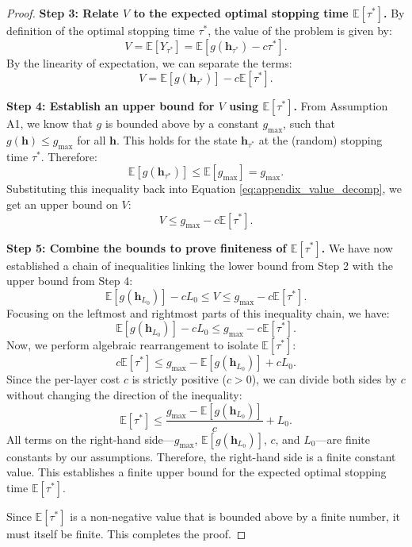 \documentclass[12pt]{imsart}
\newcommand{\E}{\mathbb{E}}
\newcommand{\h}{\mathbf{h}}
\theoremstyle{plain}
\theoremstyle{definition}
\begin{document}
\begin{proof}
\textbf{Step 3: Relate $V$ to the expected optimal stopping time $\E[\tau^*]$.}
By definition of the optimal stopping time $\tau^*$, the value of the problem is given by:
\[ V = \E[Y_{\tau^*}] = \E[g(\h_{\tau^*}) - c\tau^*]. \]
By the linearity of expectation, we can separate the terms:
\begin{equation} \label{eq:appendix_value_decomp}
V = \E[g(\h_{\tau^*})] - c\E[\tau^*].
\end{equation}

\textbf{Step 4: Establish an upper bound for $V$ using $\E[\tau^*]$.}
From Assumption A1, we know that $g$ is bounded above by a constant $g_{\max}$, such that $g(\h) \le g_{\max}$ for all $\h$. This holds for the state $\h_{\tau^*}$ at the (random) stopping time $\tau^*$. Therefore:
\[ \E[g(\h_{\tau^*})] \le \E[g_{\max}] = g_{\max}. \]
Substituting this inequality back into Equation \eqref{eq:appendix_value_decomp}, we get an upper bound on $V$:
\[ V \le g_{\max} - c\E[\tau^*]. \]

\textbf{Step 5: Combine the bounds to prove finiteness of $\E[\tau^*]$.}
We have now established a chain of inequalities linking the lower bound from Step 2 with the upper bound from Step 4:
\[ \E[g(\h_{L_0})] - c L_0 \le V \le g_{\max} - c\E[\tau^*]. \]
Focusing on the leftmost and rightmost parts of this inequality chain, we have:
\[ \E[g(\h_{L_0})] - c L_0 \le g_{\max} - c\E[\tau^*]. \]
Now, we perform algebraic rearrangement to isolate $\E[\tau^*]$:
\[ c\E[\tau^*] \le g_{\max} - \E[g(\h_{L_0})] + c L_0. \]
Since the per-layer cost $c$ is strictly positive ($c>0$), we can divide both sides by $c$ without changing the direction of the inequality:
\[ \E[\tau^*] \le \frac{g_{\max} - \E[g(\h_{L_0})]}{c} + L_0. \]
All terms on the right-hand side—$g_{\max}$, $\E[g(\h_{L_0})]$, $c$, and $L_0$—are finite constants by our assumptions. Therefore, the right-hand side is a finite constant value. This establishes a finite upper bound for the expected optimal stopping time $\E[\tau^*]$.

Since $\E[\tau^*]$ is a non-negative value that is bounded above by a finite number, it must itself be finite. This completes the proof.
\end{proof}
\end{document}
